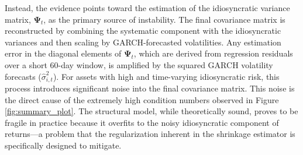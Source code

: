 \documentclass[]{article}
\begin{document}
Instead, the evidence points toward the estimation of the idiosyncratic variance matrix, $\mathbf{\Psi}_t$, as the primary source of instability. The final covariance matrix is reconstructed by combining the systematic component with the idiosyncratic variances and then scaling by GARCH-forecasted volatilities. Any estimation error in the diagonal elements of $\mathbf{\Psi}_t$, which are derived from regression residuals over a short 60-day window, is amplified by the squared GARCH volatility forecasts ($\hat{\sigma}_{i,t}^2$). For assets with high and time-varying idiosyncratic risk, this process introduces significant noise into the final covariance matrix. This noise is the direct cause of the extremely high condition numbers observed in Figure \ref{fig:summary_plot}. The structural model, while theoretically sound, proves to be fragile in practice because it overfits to the noisy idiosyncratic component of returns---a problem that the regularization inherent in the shrinkage estimator is specifically designed to mitigate.
\end{document}
